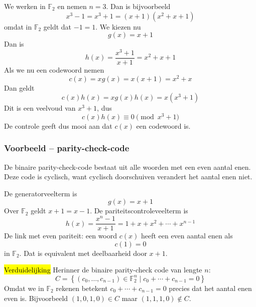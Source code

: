 \textbf{} We werken in $\mathbb{F}_2$ en nemen $n=3$. Dan is bijvoorbeeld
\begin{equation*}
    x^3-1 = x^3 + 1 = (x+1)(x^2 + x + 1)
\end{equation*}
omdat in $\mathbb{F}_2$ geldt dat $-1=1$. We kiezen nu 
\begin{equation*}
    g(x) = x+1
\end{equation*}
Dan is
\begin{equation*}
    h(x) = \frac{x^3+1}{x+1} = x^2+x+1
\end{equation*}
Als we nu een codewoord nemen
\begin{equation*}
    c(x) = xg(x) = x(x+1) = x^2+x
\end{equation*}
Dan geldt
\begin{equation*}
    c(x)h(x) = xg(x)h(x) = x(x^3+1)
\end{equation*}
Dit is een veelvoud van $x^3+1$, dus 
\begin{equation*}
    c(x)h(x) \equiv 0 \pmod {x^3+1}
\end{equation*}
De controle geeft dus mooi aan dat $c(x)$ een codewoord is.

\subsubsection{Voorbeeld -- parity-check-code}

De binaire parity-check-code bestaat uit alle woorden met een even aantal enen. Deze code is cyclisch, want cyclisch doorschuiven verandert het aantal enen niet.

De generatorveelterm is
\begin{equation*}
    g(x)=x+1
\end{equation*}
Over $\mathbb{F}_2$ geldt $x+1=x-1$. De pariteitscontroleveelterm is
\begin{equation*}
    h(x) = \frac{x^n-1}{x+1} = 1 + x + x^2 + \cdots + x^{n-1}
\end{equation*}
De link met even pariteit: een woord $c(x)$ heeft een even aantal enen als
\begin{equation*}
    c(1)=0
\end{equation*}
in $\mathbb{F}_2$. Dat is equivalent met deelbaarheid door $x+1$.

\hl{Verduidelijking}\newline
Herinner de binaire parity-check code van lengte $n$:
\begin{equation*}
    C = \left\{(c_0, \dots, c_{n-1}) \in \mathbb{F}_2^n \mid c_0 + \cdots + c_{n-1} = 0\right\}
\end{equation*}
Omdat we in $\mathbb{F}_2$ rekenen betekent $c_0 + \cdots + c_{n-1} = 0$ precies dat het aantal enen even is. Bijvoorbeeld $(1,0,1,0) \in C$ maar $(1, 1, 1, 0) \notin C$.

